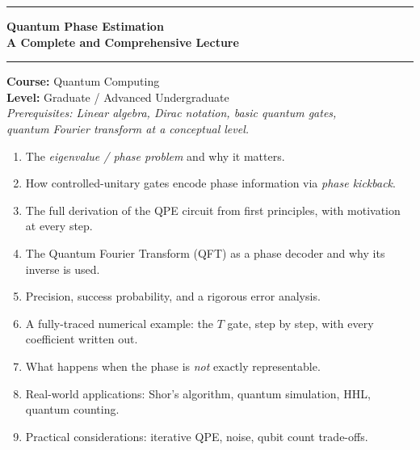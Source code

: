 \documentclass[12pt,a4paper]{article}
\begin{document}
\begin{titlepage}
  \centering
  \vspace*{1.5cm}

  {\color{qblue}\rule{\linewidth}{1.5pt}}
  \vspace{0.4cm}

  {\Huge\bfseries\color{qblue} Quantum Phase Estimation}\\[0.5em]
  {\Large\bfseries\color{qblue!70!black} A Complete and Comprehensive Lecture}

  \vspace{0.3cm}
  {\color{qblue}\rule{\linewidth}{1.5pt}}

  \vspace{1.5cm}

  \begin{tcolorbox}[colback=lightblue, colframe=qblue, width=0.85\linewidth,
      sharp corners, boxrule=1pt]
    \centering
    \textbf{Course:} Quantum Computing\\
    \textbf{Level:} Graduate / Advanced Undergraduate\\[0.3em]
    \textit{Prerequisites: Linear algebra, Dirac notation, basic quantum gates,\\
            quantum Fourier transform at a conceptual level.}
  \end{tcolorbox}

  \vspace{1.5cm}

  \begin{tcolorbox}[colback=lightyellow, colframe=qorange, width=0.85\linewidth,
      sharp corners, boxrule=1pt, title={\bfseries What You Will Learn},
      fonttitle=\bfseries\color{qorange}]
    \begin{enumerate}[leftmargin=*, label=\textbf{\arabic*.}]
      \item The \emph{eigenvalue / phase problem} and why it matters.
      \item How controlled-unitary gates encode phase information via \emph{phase kickback}.
      \item The full derivation of the QPE circuit from first principles, with motivation at every step.
      \item The Quantum Fourier Transform (QFT) as a phase decoder and why its inverse is used.
      \item Precision, success probability, and a rigorous error analysis.
      \item A fully-traced numerical example: the $T$ gate, step by step, with every coefficient written out.
      \item What happens when the phase is \emph{not} exactly representable.
      \item Real-world applications: Shor's algorithm, quantum simulation, HHL, quantum counting.
      \item Practical considerations: iterative QPE, noise, qubit count trade-offs.
    \end{enumerate}
  \end{tcolorbox}


\end{titlepage}
\end{document}
